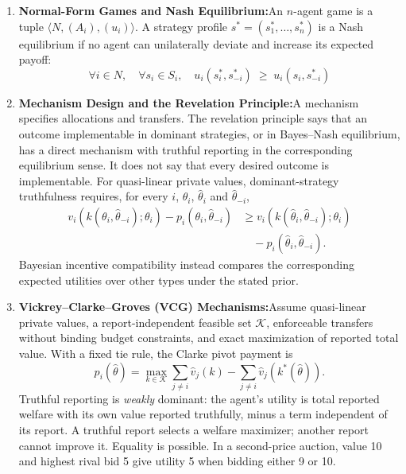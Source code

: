 \begin{enumerate}[leftmargin=1.8em,itemsep=3pt]
  \item \textbf{Normal-Form Games and Nash Equilibrium:}\enspace An $n$-agent game is a tuple $\langle N, (A_i), (u_i) \rangle$. A strategy profile $s^* = (s_1^*, \dots, s_n^*)$ is a Nash equilibrium if no agent can unilaterally deviate and increase its expected payoff:
  \begin{equation}
  \forall i \in N, \quad \forall s_i \in S_i, \quad u_i(s_i^*, s_{-i}^*) \;\ge\; u_i(s_i, s_{-i}^*)
  \end{equation}

  \item \textbf{Mechanism Design and the Revelation Principle:}\enspace A mechanism specifies allocations and transfers. The revelation principle says that an outcome implementable in dominant strategies, or in Bayes--Nash equilibrium, has a direct mechanism with truthful reporting in the corresponding equilibrium sense. It does not say that every desired outcome is implementable. For quasi-linear private values, dominant-strategy truthfulness requires, for every $i$, $\theta_i$, $\hat\theta_i$ and $\hat\theta_{-i}$,
  \begin{align}
  v_i(k(\theta_i,\hat\theta_{-i});\theta_i)-p_i(\theta_i,\hat\theta_{-i})
  &\ge v_i(k(\hat\theta_i,\hat\theta_{-i});\theta_i)\nonumber\\
  &\quad-p_i(\hat\theta_i,\hat\theta_{-i}).
  \end{align}
  Bayesian incentive compatibility instead compares the corresponding expected utilities over other types under the stated prior.

  \item \textbf{Vickrey--Clarke--Groves (VCG) Mechanisms:}\enspace Assume quasi-linear private values, a report-independent feasible set $\mathcal K$, enforceable transfers without binding budget constraints, and exact maximization of reported total value. With a fixed tie rule, the Clarke pivot payment is~
  \begin{equation}
  p_i(\hat\theta)=\max_{k\in\mathcal K}\sum_{j\ne i}\hat v_j(k)
  -\sum_{j\ne i}\hat v_j(k^*(\hat\theta)).
  \end{equation}
  Truthful reporting is \emph{weakly} dominant: the agent's utility is total reported welfare with its own value reported truthfully, minus a term independent of its report. A truthful report selects a welfare maximizer; another report cannot improve it. Equality is possible. In a second-price auction, value 10 and highest rival bid 5 give utility 5 when bidding either 9 or 10.


\end{enumerate}
